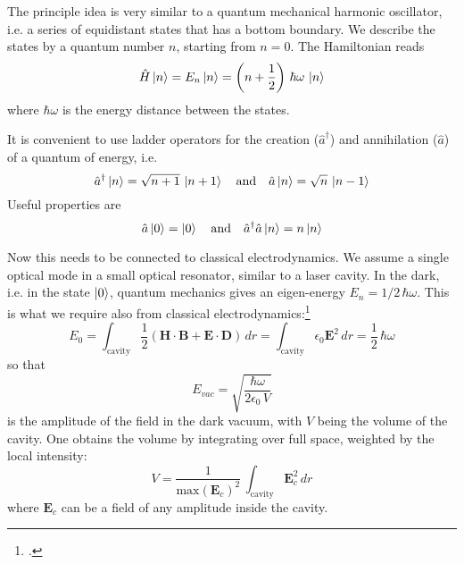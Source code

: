 The principle idea is very similar to a quantum mechanical harmonic oscillator, i.e. a series of equidistant states that has a bottom boundary. We describe the states by a quantum number $n$, starting from $n=0$. The Hamiltonian reads
\begin{equation}
\hat{H} \ket{n} = E_n \ket{n} = \left( n + \frac{1}{2} \right) \, \hbar \omega \, \ket{n}
\end{equation}
where $\hbar \omega$ is the energy distance between the states.

It is convenient to use ladder operators for the creation ($\hat{a}^\dagger$) and annihilation ($\hat{a}$) of  a quantum of energy, i.e.
\begin{equation}
 \hat{a}^\dagger \ket{n} = \sqrt{n+1}\, \ket{n+1}  \quad \text{and} \quad
  \hat{a} \ket{n} = \sqrt{n}\, \ket{n-1}
\end{equation}
Useful properties are 
\begin{equation}
 \hat{a} \ket{0} = \ket{0}  \quad \text{and} \quad
  \hat{a}^\dagger  \hat{a} \ket{n} = n \ket{n}
\end{equation}

Now this needs to be connected to  classical electrodynamics. We assume a single optical mode in a small optical resonator, similar to a laser cavity. In the dark, i.e. in the state $\ket{0}$, quantum mechanics gives an eigen-energy $E_n = 1/2 \, \hbar \omega$. This is what we require also from classical electrodynamics:\footcite[chap. 7.5]{Fox}
\begin{equation}
E_0 = 
 \int_\text{cavity} \frac{1}{2} 
 \left( \boldsymbol{H} \cdot  \boldsymbol{B} + \boldsymbol{E} \cdot  \boldsymbol{D} \right) \, dr = 
  \int_\text{cavity}  \epsilon_0 \boldsymbol{E}^2 \, dr = \frac{1}{2} \, \hbar \omega
\end{equation}
so that
\begin{equation}
E_{vac} = \sqrt{\frac{\hbar \omega}{2 \epsilon_0 \, V}}
\end{equation}
is the amplitude of the field in the dark vacuum, with $V$ being the volume of the cavity. One obtains the volume by integrating over full space, weighted by the local intensity:
\begin{equation}
V =  \frac{1}{\text{max}(\boldsymbol{E}_c)^2} \, \int_\text{cavity} \boldsymbol{E}_c^2\, dr
\end{equation}
where $\boldsymbol{E}_c$ can be a field of any amplitude inside the cavity.

